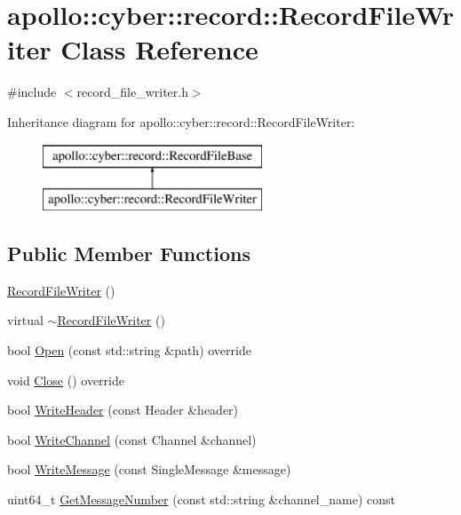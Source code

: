 \hypertarget{classapollo_1_1cyber_1_1record_1_1RecordFileWriter}{\section{apollo\-:\-:cyber\-:\-:record\-:\-:Record\-File\-Writer Class Reference}
\label{classapollo_1_1cyber_1_1record_1_1RecordFileWriter}
}


{\ttfamily \#include $<$record\-\_\-file\-\_\-writer.\-h$>$}

Inheritance diagram for apollo\-:\-:cyber\-:\-:record\-:\-:Record\-File\-Writer\-:\begin{figure}[H]
\begin{center}
\leavevmode
\includegraphics[height=2.000000cm]{classapollo_1_1cyber_1_1record_1_1RecordFileWriter}
\end{center}
\end{figure}
\subsection*{Public Member Functions}
\begin{DoxyCompactItemize}
\item 
\hyperlink{classapollo_1_1cyber_1_1record_1_1RecordFileWriter_ad6c9371e27b506c1e916b9122f2fd3f8}{Record\-File\-Writer} ()
\item 
virtual \hyperlink{classapollo_1_1cyber_1_1record_1_1RecordFileWriter_a823790f4cd9cad56cc12670209137179}{$\sim$\-Record\-File\-Writer} ()
\item 
bool \hyperlink{classapollo_1_1cyber_1_1record_1_1RecordFileWriter_a1ad9eb3d567f7864612c452a75b0c967}{Open} (const std\-::string \&path) override
\item 
void \hyperlink{classapollo_1_1cyber_1_1record_1_1RecordFileWriter_aa0eadfe8e1f3f91c17babefb0d5e4c7e}{Close} () override
\item 
bool \hyperlink{classapollo_1_1cyber_1_1record_1_1RecordFileWriter_a4d4cc68925f8d527aa6a141b46abead7}{Write\-Header} (const Header \&header)
\item 
bool \hyperlink{classapollo_1_1cyber_1_1record_1_1RecordFileWriter_ae59c16317fbababad7f2b8044ad070b3}{Write\-Channel} (const Channel \&channel)
\item 
bool \hyperlink{classapollo_1_1cyber_1_1record_1_1RecordFileWriter_adc065061c2b2153d359545a331c524c9}{Write\-Message} (const Single\-Message \&message)
\item 
uint64\-\_\-t \hyperlink{classapollo_1_1cyber_1_1record_1_1RecordFileWriter_aa396513459032609d20eb98dd5c0d758}{Get\-Message\-Number} (const std\-::string \&channel\-\_\-name) const 
\end{DoxyCompactItemize}
